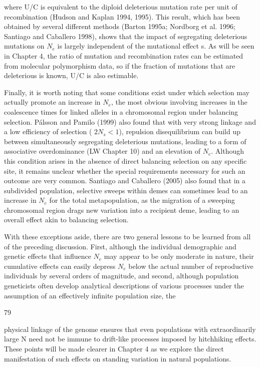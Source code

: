 \documentclass{article}
\begin{document}
where U/C is equivalent to the diploid deleterious mutation rate per unit of recombination (Hudson and Kaplan 1994, 1995). This result, which has been obtained by several different methods (Barton 1995a; Nordborg et al. 1996; Santiago and Caballero 1998), shows that the impact of segregating deleterious mutations on  $ N_{e} $ is largely independent of the mutational effect s. As will be seen in Chapter 4, the ratio of mutation and recombination rates can be estimated from molecular polymorphism data, so if the fraction of mutations that are deleterious is known, U/C is also estimable.

Finally, it is worth noting that some conditions exist under which selection may actually promote an increase in  $ N_{e} $, the most obvious involving increases in the coalescence times for linked alleles in a chromosomal region under balancing selection. Pálsson and Pamilo (1999) also found that with very strong linkage and a low efficiency of selection ( $ 2N_{s} < 1 $), repulsion disequilibrium can build up between simultaneously segregating deleterious mutations, leading to a form of associative overdominance (LW Chapter 10) and an elevation of  $ N_{e} $. Although this condition arises in the absence of direct balancing selection on any specific site, it remains unclear whether the special requirements necessary for such an outcome are very common. Santiago and Caballero (2005) also found that in a subdivided population, selective sweeps within demes can sometimes lead to an increase in  $ N_{e} $ for the total metapopulation, as the migration of a sweeping chromosomal region drags new variation into a recipient deme, leading to an overall effect akin to balancing selection.

With these exceptions aside, there are two general lessons to be learned from all of the preceding discussion. First, although the individual demographic and genetic effects that influence  $ N_{e} $ may appear to be only moderate in nature, their cumulative effects can easily depress  $ N_{e} $ below the actual number of reproductive individuals by several orders of magnitude, and second, although population geneticists often develop analytical descriptions of various processes under the assumption of an effectively infinite population size, the

79

physical linkage of the genome ensures that even populations with extraordinarily large N need not be immune to drift-like processes imposed by hitchhiking effects. These points will be made clearer in Chapter 4 as we explore the direct manifestation of such effects on standing variation in natural populations.
\end{document}
